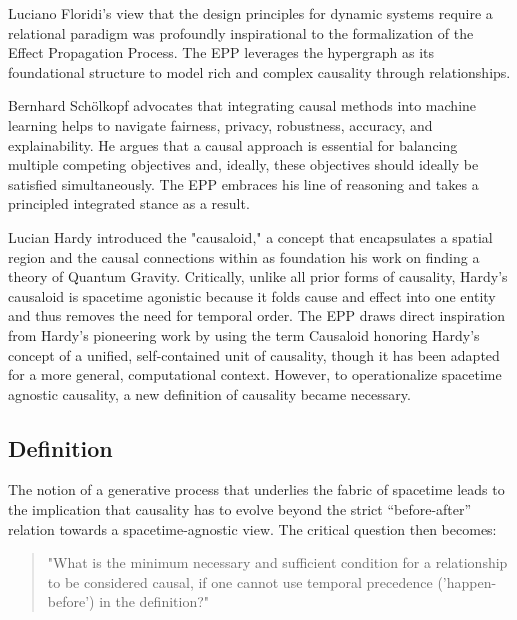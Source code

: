 Luciano Floridi's view\cite{floridi2025applied} that the design principles for  dynamic systems require a relational paradigm was profoundly inspirational to the formalization of the Effect Propagation Process. The EPP leverages the hypergraph as its foundational structure to model rich and complex causality through relationships. 

 Bernhard Schölkopf\cite{binkyte2025causalitykeyunderstandbalance} advocates that integrating causal methods into machine learning helps to navigate fairness, privacy, robustness, accuracy, and explainability. He argues that  a causal approach is essential for balancing multiple competing objectives and, ideally, these objectives should ideally be satisfied simultaneously. The EPP embraces his line of reasoning and takes a principled integrated stance as a result.  
 
Lucian Hardy introduced the "causaloid,"\cite{HardyDynamicCausalStructure} a concept that encapsulates a spatial region and the causal connections within  as foundation his work on finding a theory of Quantum Gravity. Critically, unlike all prior forms of causality, Hardy's causaloid is spacetime agonistic because it folds cause and effect into one entity and thus removes the need for temporal order. The EPP draws direct inspiration from Hardy’s pioneering work by using the term Causaloid honoring Hardy's concept of a unified, self-contained unit of causality, though it has been adapted for a more general, computational context. However, to operationalize spacetime agnostic causality, a new definition of causality became necessary. 

 
 \newpage
 
 
%
\subsection{Definition}
\label{sec:epp_definition}


The notion of a generative process that underlies the fabric of spacetime leads to the implication that causality has to evolve beyond the strict “before-after” relation towards a spacetime-agnostic view. The critical question then becomes:

\begin{quote}
	"What is the minimum necessary and sufficient condition for a relationship to be considered causal, 
	if one cannot use temporal precedence ('happen-before') in the definition?"
\end{quote}

